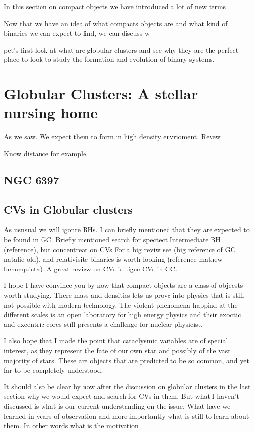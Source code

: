 In this section on compact objects we have introduced a lot of new terms

Now that we have an idea of what compacts objects are and what kind of binaries we can expect to find, we can discuss w


pet's first look at what are globular clusters and see why they are the perfect place to look to study the formation and evolution of binary systems. 


\section{Globular Clusters: A stellar nursing home}\label{sec:gc}

As we saw. We expect them to form in high density envrioment. Revew 

Know distance for example. 

\subsection{NGC 6397}



\subsection{CVs in Globular clusters}\label{sec:cogc}


As usnsual we will igonre BHs. I can briefly mentioned that they are expected to be found in GC. Briefly mentioned search for spectect Intermediate BH (reference), but concentreat on CVs
For a big reviw see (big reference of GC natalie old), and relativisitc binaries is worth looking (reference mathew benacquista). A great review on CVs is kigee CVs in GC. 


I hope I have convince you by now that compact objects are a class of objecsts worth studying. There mass and densities lets us prove into physics that is still not possible with modern technology. The violent phenomena happind at the different scales is an open laboratory for high energy physics and their exoctic and excentric cores still presents a challenge for nuclear physicist. 

I also hope that I made the point that cataclysmic variables are of special interest, as they represent the fate of our own star and possibly of the vast majority of stars. These are objects that are predicted to be so common, and yet far to be completely understood. 

It should also be clear by now after the discussion on globular clusters in the last section why we would expect and search for CVs in them. But what I haven't discussed is what is our current understanding on the issue. What have we learned in years of observation and more importantly what is still to learn about them. In other words what is the motivation



